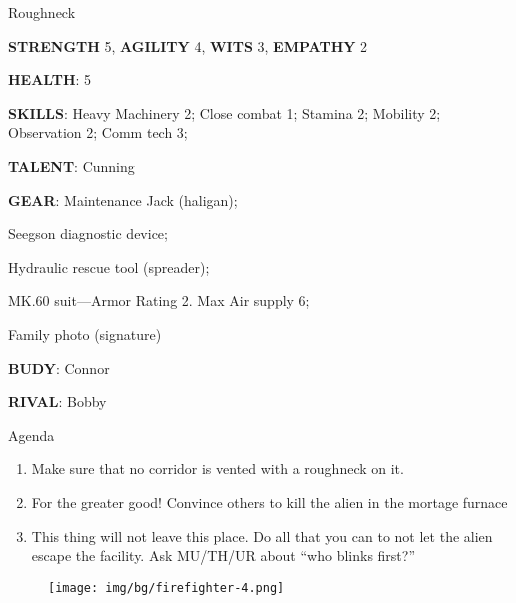 \begin{rpg-commentbox}{}
    Roughneck

    \textbf{STRENGTH} 5, \textbf{AGILITY} 4, \textbf{WITS} 3, \textbf{EMPATHY} 2

    \textbf{HEALTH}: 5

    \textbf{SKILLS}: Heavy Machinery 2; Close combat 1; Stamina 2; Mobility 2; Observation 2; Comm tech 3;
    
    \textbf{TALENT}: Cunning
    
    \textbf{GEAR}: Maintenance Jack (haligan);
    
    Seegson diagnostic device;
    
    Hydraulic rescue tool (spreader);
    
    MK.60 suit---Armor Rating 2. Max Air supply 6;  
    
    Family photo (signature)

    \textbf{BUDY}: Connor
    
    \textbf{RIVAL}: Bobby
\end{rpg-commentbox}


\begin{rpg-commentbox}{Agenda}
    \begin{enumerate}[label=\textbf{Act \arabic*}, leftmargin=1cm]
        \item Make sure that no corridor is vented with a roughneck on it.
        \item For the greater good! Convince others to kill the alien in the mortage furnace
        \item This thing will not leave this place. Do all that you can to not let the alien escape the facility. Ask MU/TH/UR about ``who blinks first?''
    \end{enumerate}
\end{rpg-commentbox}


\newsect

\begin{figure}
    \centering
    \texttt{[image: img/bg/firefighter-4.png]}
    \label{fig:refinery}
\end{figure}




\clearpage

